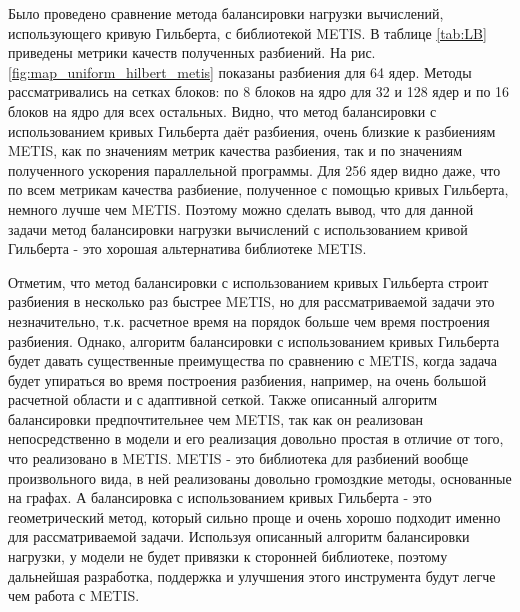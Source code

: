 Было проведено сравнение метода балансировки нагрузки вычислений, использующего кривую Гильберта, с библиотекой METIS.
В таблице \ref{tab:LB} приведены метрики качеств полученных разбиений. 
На рис. \ref{fig:map_uniform_hilbert_metis} показаны разбиения для 64 ядер. 
Методы рассматривались на сетках блоков: по 8 блоков на ядро для 32 и 128 ядер и по 16 блоков на ядро для всех остальных. 
Видно, что метод балансировки с использованием кривых Гильберта даёт разбиения, очень близкие к разбиениям METIS, как по значениям метрик качества разбиения, так и по значениям полученного ускорения параллельной программы.    
Для 256 ядер видно даже, что по всем метрикам качества разбиение, полученное с помощью кривых Гильберта, немного лучше чем METIS.
Поэтому можно сделать вывод, что для данной задачи метод балансировки нагрузки вычислений с использованием кривой Гильберта - это хорошая альтернатива библиотеке METIS.   
    
Отметим, что метод балансировки с использованием кривых Гильберта строит разбиения в несколько раз быстрее METIS, но для рассматриваемой задачи это незначительно, т.к. расчетное время на порядок больше чем время построения разбиения. 
Однако, алгоритм балансировки с использованием кривых Гильберта будет давать существенные преимущества по сравнению с METIS, когда задача будет упираться во время построения разбиения, например, на очень большой расчетной области и с адаптивной сеткой.
Также описанный алгоритм балансировки предпочтительнее чем METIS, так как он реализован непосредственно в модели и его реализация довольно простая в отличие от того, что реализовано в METIS. METIS - это библиотека для разбиений вообще произвольного вида, в ней реализованы довольно громоздкие методы, основанные на графах. А балансировка с использованием кривых Гильберта - это геометрический метод, который сильно проще и очень хорошо подходит именно для рассматриваемой задачи.  
Используя описанный алгоритм балансировки нагрузки, у модели не будет привязки к сторонней библиотеке, поэтому дальнейшая разработка, поддержка и улучшения этого инструмента будут легче чем работа с METIS.
    
    
